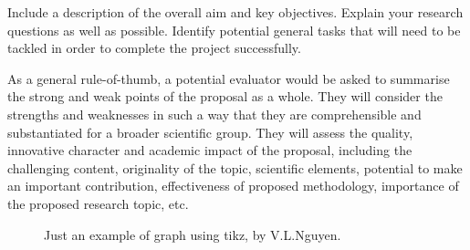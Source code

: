 Include a description of the overall aim and key objectives. Explain your research questions as well as possible. Identify potential general tasks that will need to be tackled in order to complete the project successfully.

As a general rule-of-thumb, a potential evaluator would be asked to summarise the strong and weak points of the proposal as a whole. They will consider the strengths and weaknesses in such a way that they are comprehensible and substantiated for a broader scientific group. They will assess the quality, innovative character and academic impact of the proposal, including the challenging content, originality of the topic, scientific elements, potential to make an important contribution, effectiveness of proposed methodology, importance of the proposed research topic, etc.

\nocite{arias2016scalable}
\nocite{batal2013efficient}
\nocite{bi2013inferring}
\nocite{bielza2011multi}

\begin{figure}[!h]
    \begin{center}


        \caption{Just an example of graph using tikz, by V.L.Nguyen.}
        \label{fig:examplegraph}
    \end{center}
\end{figure}